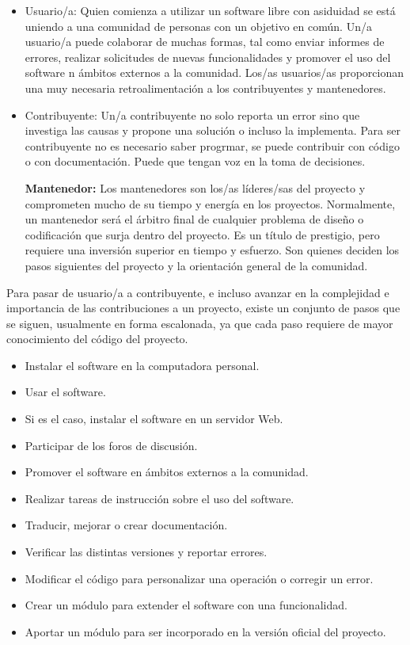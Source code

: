 \begin{itemize}
\item{Usuario/a:} Quien comienza a utilizar un software libre con asiduidad se está uniendo a una comunidad de personas con un objetivo en común. Un/a usuario/a puede colaborar de muchas formas, tal como enviar informes de errores, realizar solicitudes de nuevas funcionalidades y promover el uso del software n ámbitos externos a la comunidad. Los/as usuarios/as proporcionan una muy necesaria retroalimentación a los contribuyentes y mantenedores.

\item{Contribuyente:} Un/a contribuyente no solo reporta un error sino que investiga las causas y propone una solución o incluso la implementa. Para ser contribuyente no es necesario saber progrmar, se puede contribuir con código o con documentación. Puede que tengan voz en la toma de decisiones.

\textbf{Mantenedor:} Los mantenedores son los/as líderes/sas del proyecto y comprometen mucho de su tiempo y energía en los proyectos. Normalmente, un mantenedor será el árbitro final de cualquier problema de diseño o codificación que surja dentro del proyecto. Es un título de prestigio, pero requiere una inversión superior en tiempo y esfuerzo. Son quienes deciden los pasos siguientes del proyecto y la orientación general de la comunidad.
\end{itemize}

Para pasar de usuario/a a contribuyente, e incluso avanzar en la complejidad e importancia de las contribuciones a un proyecto, existe un conjunto de pasos que se siguen, usualmente en forma escalonada, ya que cada paso requiere de mayor conocimiento del código del proyecto.

\begin{itemize}
     \item Instalar el software en la computadora personal.
     \item Usar el software.
     \item Si es el caso, instalar el software en un servidor Web. 
     \item Participar de los foros de discusión.
     \item Promover el software en ámbitos externos a la comunidad.
     \item Realizar tareas de instrucción sobre el uso del software.
     \item Traducir, mejorar o crear documentación.
     \item Verificar las distintas versiones y reportar errores.
     \item Modificar el código para personalizar una operación o corregir un error.
     \item Crear un módulo para extender el software con una funcionalidad.
     \item Aportar un módulo para ser incorporado en la versión oficial del proyecto.
\end{itemize}

